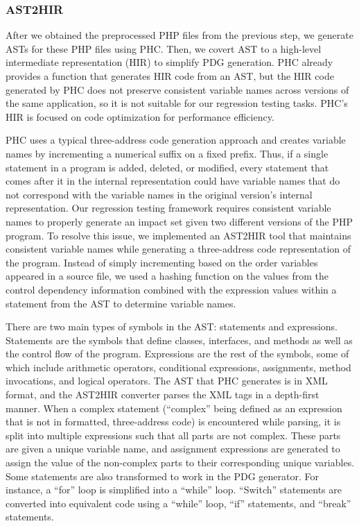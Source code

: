 \subsubsection{AST2HIR}
\label{sec:ast2hir}

After we obtained the preprocessed PHP files from the previous step,    
we generate ASTs for these PHP files using PHC.
Then, we covert AST to a high-level intermediate representation (HIR) 
to simplify PDG generation. PHC already provides a function that 
generates HIR code from an AST, but the HIR code generated by PHC does 
not preserve consistent variable names across versions of the same 
application, so it is not suitable for our regression testing tasks. 
PHC's HIR is focused on code optimization for performance efficiency.

PHC uses a typical three-address code generation approach and creates 
variable names by incrementing a numerical suffix on a fixed prefix. 
Thus, if a single statement in a program is added, deleted, 
or modified, every statement that comes after it in the internal 
representation could have variable names that do not correspond with 
the variable names in the original version's internal representation. 
Our regression testing framework requires consistent variable names 
to properly generate an impact set given two different versions of 
the PHP program.
To resolve this issue, we implemented an AST2HIR tool that maintains 
consistent variable names while generating a three-address 
code representation of the program. Instead of simply incrementing 
based on the order variables appeared in a source file, we used 
a hashing function on the values from the control dependency 
information combined with the expression values within a statement 
from the AST to determine variable names.

There are two main types of symbols in the AST: statements and 
expressions. Statements are the symbols that define classes, interfaces, 
and methods as well as the control flow of the program. Expressions 
are the rest of the symbols, some of which include arithmetic operators, 
conditional expressions, assignments, method invocations, and logical 
operators. The AST that PHC generates is in XML format, and the AST2HIR 
converter parses the XML tags in a depth-first manner. 
When a complex statement (``complex'' being defined as an expression 
that is not in formatted, three-address code) is encountered while 
parsing, it is split into multiple expressions such that all parts 
are not complex. These parts are given a unique variable name, 
and assignment expressions are generated to assign the value of 
the non-complex parts to their corresponding unique variables.
Some statements are also transformed to work in the PDG generator. 
For instance, a ``for'' loop is simplified into a ``while'' loop. 
``Switch'' statements are converted into equivalent code using a 
``while'' loop, ``if'' statements, and ``break'' statements.

